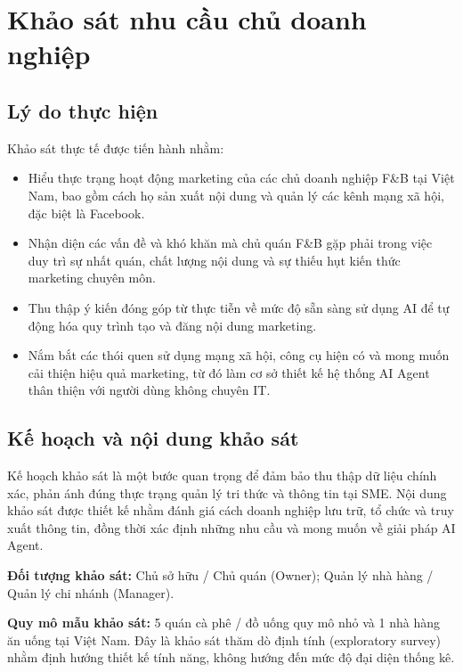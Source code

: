 \section{Khảo sát nhu cầu chủ doanh
nghiệp}\label{sec:khao-sat}

\subsection{Lý do thực hiện}

Khảo sát thực tế được tiến hành nhằm:

\begin{itemize}
\item
  Hiểu thực trạng hoạt động marketing của các chủ doanh nghiệp F\&B tại
  Việt Nam, bao gồm cách họ sản xuất nội dung và quản lý các kênh mạng
  xã hội, đặc biệt là Facebook.
\item
  Nhận diện các vấn đề và khó khăn mà chủ quán F\&B gặp phải trong việc
  duy trì sự nhất quán, chất lượng nội dung và sự thiếu hụt kiến thức
  marketing chuyên môn.
\item
  Thu thập ý kiến đóng góp từ thực tiễn về mức độ sẵn sàng sử dụng AI
  để tự động hóa quy trình tạo và đăng nội dung marketing.
\item
  Nắm bắt các thói quen sử dụng mạng xã hội, công cụ hiện có và mong
  muốn cải thiện hiệu quả marketing, từ đó làm cơ sở thiết kế hệ thống
  AI Agent thân thiện với người dùng không chuyên IT.
\end{itemize}

\subsection{Kế hoạch và nội dung khảo sát}

Kế hoạch khảo sát là một bước quan trọng để đảm bảo thu thập dữ liệu
chính xác, phản ánh đúng thực trạng quản lý tri thức và thông tin tại
SME. Nội dung khảo sát được thiết kế nhằm đánh giá cách doanh nghiệp lưu
trữ, tổ chức và truy xuất thông tin, đồng thời xác định những nhu cầu và
mong muốn về giải pháp AI Agent.

\textbf{Đối tượng khảo sát:} Chủ sở hữu / Chủ quán (Owner); Quản lý nhà
hàng / Quản lý chi nhánh (Manager).

\textbf{Quy mô mẫu khảo sát:} 5 quán cà phê / đồ uống quy mô nhỏ và
1 nhà hàng ăn uống tại Việt Nam. Đây là khảo sát thăm dò định tính
(exploratory survey) nhằm định hướng thiết kế tính năng, không hướng
đến mức độ đại diện thống kê.

